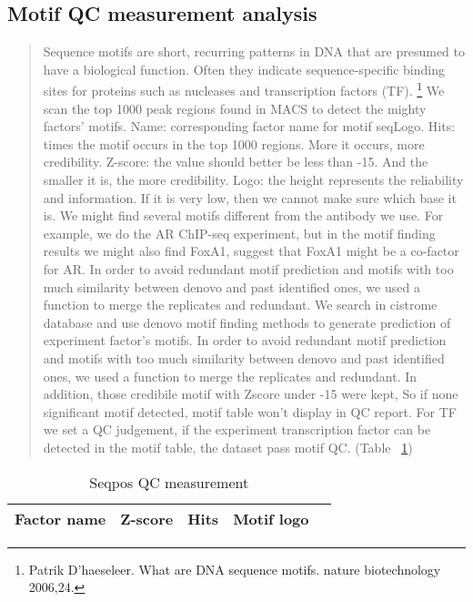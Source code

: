 \documentclass[11pt,a4paper]{article}
\begin{document}
\subsection{Motif QC measurement analysis}
\begin{quotation}
Sequence motifs are short, recurring patterns in DNA that are presumed to have a biological function. Often they indicate sequence-specific binding sites for proteins such as nucleases and transcription factors (TF). \footnote{ Patrik D'haeseleer. What are DNA sequence motifs. nature biotechnology 2006,24.}
We scan the top 1000 peak regions found in MACS to detect the mighty factors' motifs. 
Name: corresponding factor name for motif seqLogo.
Hits: times the motif occurs in the top 1000 regions. More it occurs, more credibility.
Z-score: the value should better be less than -15. And the smaller it is, the more credibility.
Logo: the height represents the reliability and information. If it is very low, then we cannot make sure which base it is.
We might find several motifs different from the antibody we use. For example, we do the AR ChIP-seq experiment, but in the motif finding results we might also find FoxA1, suggest that FoxA1 might be a co-factor for AR. 
In order to avoid redundant motif prediction and motifs with too much similarity between denovo and past identified ones, we used a  function to merge the replicates and redundant. 
We search in cistrome database and use denovo motif finding methods 
to generate prediction of experiment factor's motifs. 
In order to avoid redundant motif prediction and motifs with too much similarity between denovo and past identified ones, we used a  function to merge the replicates and redundant. In addition, those credibile motif with Zscore under -15 were kept, So if none significant motif detected, motif table won't display in QC report.
For TF we set a QC judgement, if the experiment transcription factor can be detected in the motif table, the dataset pass motif QC.   (Table ~\ref{motif})
\end{quotation}

\begin{table}[h]
        \caption{Seqpos QC measurement} \label{motif}
\begin{tabularx}{1.2\textwidth}{ |X|c|c|c|X| }
\hline
Factor name & Z-score & Hits  & Motif logo \tabularnewline
\hline
\end{tabularx}
\end{table}
\newpage
\end{document}
